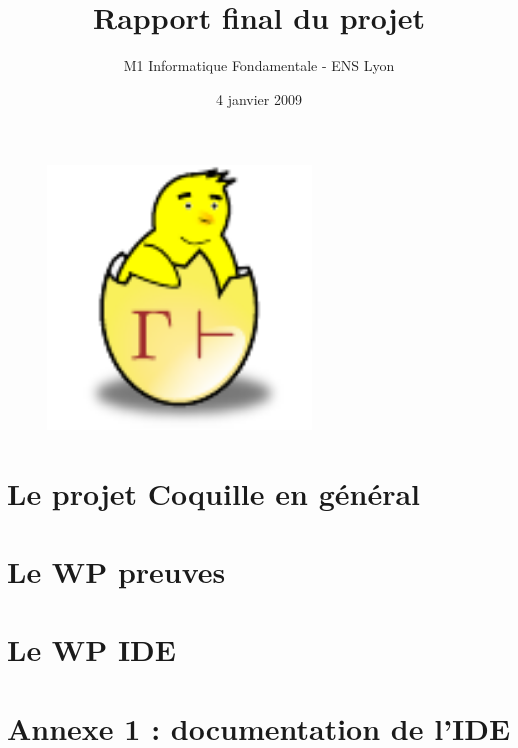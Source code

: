 \documentclass[a4paper,10pt]{article}
\date{4 janvier 2009}
\title{Rapport final du projet \coquille{}}
\author{M1 Informatique Fondamentale - ENS Lyon}
\begin{document}
\begin{figure}
\begin{center}
 \includegraphics[width=7cm]{poussin.pdf}
\end{center}
\end{figure}
\maketitle
\newpage

\tableofcontents
\newpage

\part{Le projet Coquille en g\'en\'eral}



\part{Le WP preuves}



\part{Le WP IDE}


% 




\newpage

\part{Annexe 1 : documentation de l'IDE}

%
\end{document}

